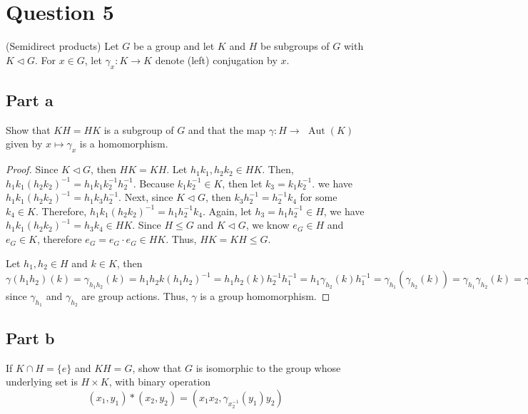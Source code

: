 \section{Question 5}

\begin{question}
    (Semidirect products) Let $G$ be a group and let $K$ and $H$ be subgroups of $G$ with $K \triangleleft G$. For $x \in G$, let $\gamma_x: K \rightarrow K$ denote (left) conjugation by $x$.
\end{question}

\subsection{Part a}

\begin{question}
    Show that $K H=H K$ is a subgroup of $G$ and that the map $\gamma: H \rightarrow$ $\operatorname{Aut}(K)$ given by $x \mapsto \gamma_x$ is a homomorphism.
\end{question}

\begin{answer}
    \begin{proof}
        Since $K \triangleleft G$, then $HK = KH$. Let $h_1k_1, h_2k_2 \in HK$. Then, $h_1k_1(h_2k_2)^{-1} = h_1k_1k_2^{-1}h_2^{-1}$. Because $k_1k_2^{-1} \in K$, then let $k_3 = k_1k_2^{-1}$. we have $h_1k_1(h_2k_2)^{-1} = h_1k_3h_2^{-1}$. Next, since $K \triangleleft G$, then $k_3h_2^{-1} = h_2^{-1}k_4$ for some $k_4 \in K$. Therefore, $h_1k_1(h_2k_2)^{-1} = h_1h_2^{-1}k_4$. Again, let $h_3 = h_1h_2^{-1} \in H$, we have $h_1k_1(h_2k_2)^{-1} = h_3k_4 \in HK$. Since $H \leq G$ and $K \triangleleft G$, we know $e_G \in H$ and $e_G \in K$, therefore $e_G = e_G\cdot e_G \in HK$. Thus, $HK = KH \leq G$.
        
        Let $h_1,h_2 \in H$ and $k \in K$, then $\gamma(h_1h_2)(k) = \gamma_{h_1h_2}(k) = h_1h_2k(h_1h_2)^{-1} = h_1h_2(k)h_2^{-1}h_1^{-1} = h_1\gamma_{h_2}(k)h_1^{-1} = \gamma_{h_1}(\gamma_{h_2}(k)) = \gamma_{h_1}\gamma_{h_2}(k) = \gamma(h_1)\gamma(h_2)(k)$ since $\gamma_{h_1}$ and $\gamma_{h_2}$ are group actions. Thus, $\gamma$ is a group homomorphism.
    \end{proof}
\end{answer}

\subsection{Part b}

\begin{question}
    If $K \cap H=\{e\}$ and $K H=G$, show that $G$ is isomorphic to the group whose underlying set is $H \times K$, with binary operation
    $$
    \left(x_1, y_1\right) *\left(x_2, y_2\right)=\left(x_1 x_2, \gamma_{x_2^{-1}}\left(y_1\right) y_2\right)
    $$
\end{question}

